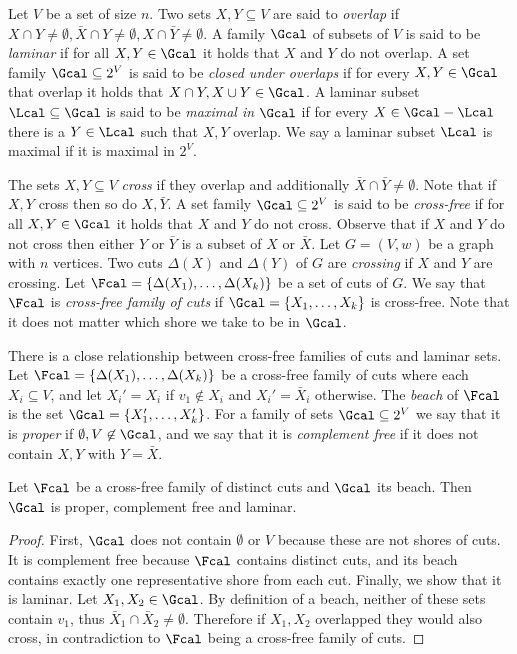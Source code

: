 Let $V$ be a set of size $n$. Two sets $X,Y \subseteq V$ are said to \emph{overlap} if $X \cap Y \ne \emptyset, \bar{X} \cap Y \ne \emptyset,
X \cap \bar{Y} \ne \emptyset$.
 A family $\Gcal$ of subsets of $V$ is said to be \emph{laminar} if for all $X,Y \in \Gcal$
it holds that $X$ and $Y$ do not overlap. A set family $\Gcal \subseteq 2^{V}$ is said to be \emph{closed under overlaps}
if for every $X,Y \in \Gcal$ that overlap it holds
that $X \cap Y, X \cup Y \in \Gcal$.  A laminar subset $\Lcal \subseteq \Gcal$ is said to be \emph{maximal in} $\Gcal$ if for every $X \in \Gcal - \Lcal$
there is a $Y \in \Lcal$ such that $X,Y$ overlap.  We say a laminar subset $\Lcal$ is maximal if it is maximal in $2^{V}$.


The sets $X,Y \subseteq V$ \emph{cross} if they overlap and additionally $\bar{X} \cap \bar{Y} \ne \emptyset$.
Note that if $X,Y$ cross then so do $X,\bar{Y}$. A set family $\Gcal \subseteq 2^{V}$ is said to be {\em cross-free} if for all $X,Y \in \Gcal$ it holds
that $X$ and $Y$ do not cross. Observe that if $X$ and $Y$ do not cross
then either $Y$ or $\bar{Y}$ is a subset of $X$ or $\bar{X}$.
Let $G = (V,w)$ be a graph with $n$ vertices.
Two cuts $\Delta(X)$ and $\Delta(Y)$ of $G$ are {\em crossing} if $X$ and $Y$ are crossing.
Let $\Fcal = \{ \Delta(X_1), \ldots,  \Delta(X_k) \}$ be a set of cuts of $G$.
We say that $\Fcal$ is {\em cross-free family of cuts} if
$\Gcal = \{X_1, \ldots, X_k\}$ is cross-free.  Note that it does not matter which shore we take to be in $\Gcal$.

There is a close relationship between cross-free families of cuts and laminar sets.
Let $\Fcal = \{ \Delta(X_1), \ldots,  \Delta(X_k) \}$ be a cross-free family of cuts where each $X_i \subseteq V$,
and let $X_i' = X_i$ if $v_1 \not \in X_i$ and $X_i' = \bar{X}_i$ otherwise.
The \emph{beach} of $\Fcal$ is the set $\Gcal = \{X_1', \ldots, X_k'\}$.
For a family of sets $\Gcal \subseteq 2^{V}$ we say that it is \emph{proper} if $\emptyset, V \not \in \Gcal$,
and we say that it is \emph{complement free} if it does not contain $X,Y$ with $Y = \bar{X}$.

\begin{claim}\label{claim:cross-free}
Let $\Fcal$ be a cross-free family of distinct cuts and $\Gcal$ its beach.  Then $\Gcal$ is proper, complement free and laminar.
\end{claim}

\begin{proof}
First, $\Gcal$ does not contain $\emptyset$ or $V$ because these are not shores of cuts.  It is complement free because $\Fcal$ contains
distinct cuts, and its beach contains exactly one representative shore from each cut.  Finally, we show that it is laminar.  Let
$X_1, X_2 \in \Gcal$.  By definition of a beach, neither of these sets contain $v_1$, thus $\bar{X}_1 \cap \bar{X}_2 \ne \emptyset$.  Therefore if
$X_1, X_2$ overlapped they would also cross, in contradiction to $\Fcal$ being a cross-free family of cuts.
\end{proof}

